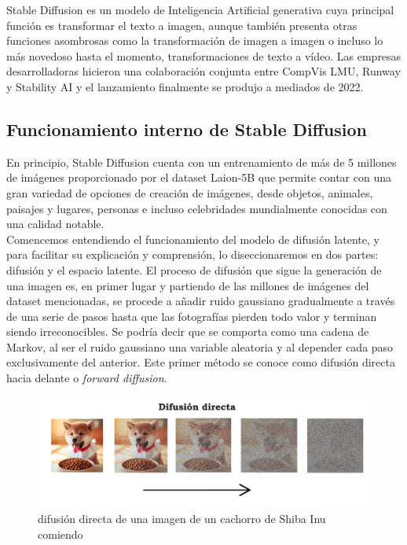 Stable Diffusion es un modelo de Inteligencia Artificial generativa cuya principal función es transformar el texto a imagen, aunque también presenta otras funciones asombrosas como la transformación de imagen a imagen o incluso lo más novedoso hasta el momento, transformaciones de texto a vídeo. Las empresas desarrolladoras hicieron una colaboración conjunta entre CompVis LMU, Runway y Stability AI y el lanzamiento finalmente se produjo a mediados de 2022. \\


\subsection{Funcionamiento interno de Stable Diffusion}

En principio, Stable Diffusion cuenta con un entrenamiento de más de 5 millones de imágenes proporcionado por el dataset Laion-5B que permite contar con una gran variedad de opciones de creación de imágenes, desde objetos, animales, paisajes y lugares, personas e incluso celebridades mundialmente conocidas con una calidad notable.\\ 

Comencemos entendiendo el funcionamiento del modelo de difusión latente, y para facilitar su explicación y comprensión,  lo diseccionaremos en dos partes: difusión y el espacio latente. El proceso de difusión que sigue la generación de una imagen es, en primer lugar y partiendo de las millones de imágenes del dataset mencionadas, se procede a añadir ruido gaussiano gradualmente a través de una serie de pasos hasta que las fotografías pierden todo valor y terminan siendo irreconocibles. Se podría decir que se comporta como una cadena de Markov, al ser el ruido gaussiano una variable aleatoria y al depender cada paso exclusivamente del anterior. Este primer método se conoce como difusión directa hacia delante o \textit{forward diffusion}.\\

\begin{figure}[h]
	\centering
	\includegraphics[width = 1 \textwidth]{Imagenes/Vectorial/difusiondirecta.png}
	\caption{difusión directa de una imagen de un cachorro de Shiba Inu comiendo}
	\label{fig:difusiondirecta}
\end{figure}


